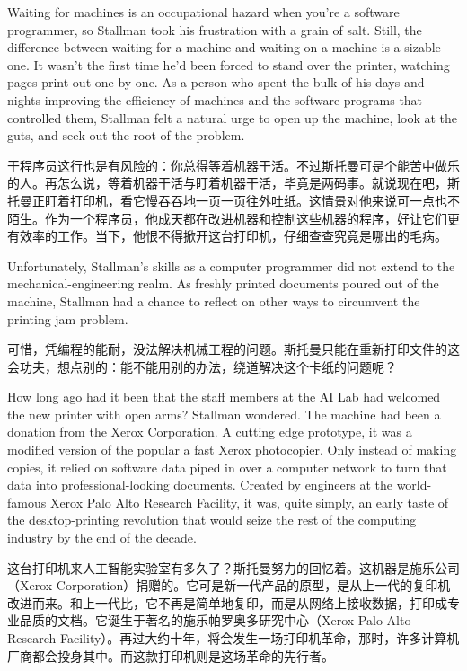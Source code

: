 \ifdefined\eng
Waiting for machines is an occupational hazard when you're a software programmer, so Stallman took his frustration with a grain of salt. Still, the difference between waiting for a machine and waiting on a machine is a sizable one. It wasn't the first time he'd been forced to stand over the printer, watching pages print out one by one. As a person who spent the bulk of his days and nights improving the efficiency of machines and the software programs that controlled them, Stallman felt a natural urge to open up the machine, look at the guts, and seek out the root of the problem.
\fi

\ifdefined\chs
干程序员这行也是有风险的：你总得等着机器干活。不过斯托曼可是个能苦中做乐的人。再怎么说，等着机器干活与盯着机器干活，毕竟是两码事。就说现在吧，斯托曼正盯着打印机，看它慢吞吞地一页一页往外吐纸。这情景对他来说可一点也不陌生。作为一个程序员，他成天都在改进机器和控制这些机器的程序，好让它们更有效率的工作。当下，他恨不得掀开这台打印机，仔细查查究竟是哪出的毛病。
\fi

\ifdefined\eng
Unfortunately, Stallman's skills as a computer programmer did not extend to the mechanical-engineering realm. As freshly printed documents poured out of the machine, Stallman had a chance to reflect on other ways to circumvent the printing jam problem.
\fi

\ifdefined\chs
可惜，凭编程的能耐，没法解决机械工程的问题。斯托曼只能在重新打印文件的这会功夫，想点别的：能不能用别的办法，绕道解决这个卡纸的问题呢？
\fi

\ifdefined\eng
How long ago had it been that the staff members at the AI Lab had welcomed the new printer with open arms? Stallman wondered. The machine had been a donation from the Xerox Corporation. A cutting edge prototype, it was a modified version of 
\ifdefined\vone
the popular
\fi
\ifdefined\vtwo
a fast
\fi
Xerox photocopier. Only instead of making copies, it relied on software data piped in over a computer network to turn that data into professional-looking documents. Created by engineers at the world-famous Xerox Palo Alto Research Facility, it was, quite simply, an early taste of the desktop-printing revolution that would seize the rest of the computing industry by the end of the decade.
\fi

\ifdefined\chs
这台打印机来人工智能实验室有多久了？斯托曼努力的回忆着。这机器是施乐公司（Xerox Corporation）捐赠的。它可是新一代产品的原型，是从上一代的复印机改进而来。和上一代比，它不再是简单地复印，而是从网络上接收数据，打印成专业品质的文档。它诞生于著名的施乐帕罗奥多研究中心（Xerox Palo Alto Research Facility）。再过大约十年，将会发生一场打印机革命，那时，许多计算机厂商都会投身其中。而这款打印机则是这场革命的先行者。
\fi

